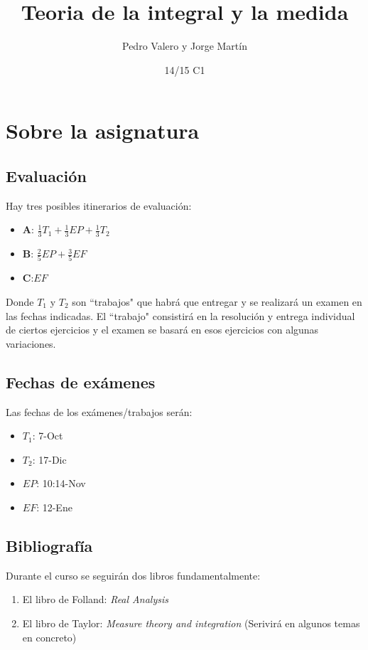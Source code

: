 \documentclass{apuntes}
\title{Teoria de la integral y la medida}
\author{Pedro Valero y Jorge Martín}
\date{14/15 C1}
\begin{document}
\pagestyle{plain}
\maketitle

\tableofcontents
\newpage

\chapter{Sobre la asignatura}
\section{Evaluación}
Hay tres posibles itinerarios de evaluación:
\begin{itemize}
\item \textbf{A}: $\frac{1}{3}T_1+\frac{1}{3}EP+\frac{1}{3}T_2$
\item \textbf{B}: $\frac{2}{5}EP+ \frac{3}{5}EF$
\item \textbf{C}:$EF$
\end{itemize}
Donde $T_1$  y $T_2$ son ``trabajos" que habrá que entregar y se realizará un examen en las fechas indicadas. El ``trabajo" consistirá en la resolución y entrega individual de ciertos ejercicios y el examen se basará en esos ejercicios con algunas variaciones.

\section{Fechas de exámenes}
Las fechas de los exámenes/trabajos serán:
\begin{itemize}
\item $T_1$: 7-Oct
\item $T_2$: 17-Dic
\item $EP$: 10:14-Nov
\item $EF$: 12-Ene
\end{itemize}

\section{Bibliografía}
Durante el curso se seguirán dos libros fundamentalmente:
\begin{enumerate}
\item El libro de Folland: \textit{Real Analysis}
\item El libro de Taylor: \textit{Measure theory and integration} (Serivirá en algunos temas en concreto)
\end{enumerate}
\end{document}
